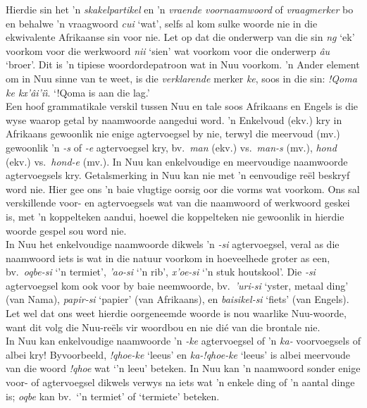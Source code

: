 Hierdie sin het 'n \emph{skakelpartikel} en 'n \emph{vraende
voornaamwoord} of \emph{vraagmerker} bo en behalwe 'n vraagwoord
\emph{cui} `wat', selfs al kom sulke woorde nie in die ekwivalente
Afrikaanse sin voor nie. Let op dat die onderwerp van die sin
\emph{ng} `ek' voorkom voor die werkwoord
\emph{n\textipa{\textvertline}ii} `sien' wat voorkom voor die
onderwerp \emph{\textipa{\textdoublevertline}\^{a}u} `broer'. Dit is
'n tipiese woordordepatroon wat in N\textipa{\textvertline}uu voorkom.
'n Ander element om in N\textipa{\textvertline}uu sinne van te weet,
is die \emph{verklarende} merker \emph{ke}, soos in die sin:
\emph{!Qoma ke kx'\^{a}i'i\^{\i}}.  `!Qoma is aan die lag.'\\

Een hoof grammatikale verskil tussen N\textipa{\textvertline}uu en
tale soos Afrikaans en Engels is die wyse waarop getal by naamwoorde
aangedui word. 'n Enkelvoud (ekv.) kry in Afrikaans gewoonlik nie
enige agtervoegsel by nie, terwyl die meervoud (mv.) gewoonlik 'n
\emph{-s} of \emph{-e} agtervoegsel kry, bv.\ \emph{man} (ekv.) vs.\
\emph{man-s} (mv.), \emph{hond} (ekv.) vs.\ \emph{hond-e} (mv.). In
N\textipa{\textvertline}uu kan enkelvoudige en meervoudige naamwoorde
agtervoegsels kry. Getalsmerking in N\textipa{\textvertline}uu kan nie
met 'n eenvoudige re\"{e}l beskryf word nie. Hier gee ons 'n baie
vlugtige oorsig oor die vorms wat voorkom. Ons sal verskillende voor-
en agtervoegsels wat van die naamwoord of werkwoord geskei is, met 'n
koppelteken aandui, hoewel die koppelteken nie gewoonlik in hierdie
woorde gespel sou word nie.\\

In N\textipa{\textvertline}uu het enkelvoudige naamwoorde dikwels 'n
\emph{-si} agtervoegsel, veral as die naamwoord iets is wat in die
natuur voorkom in hoeveelhede groter as een, bv.\
\emph{\textipa{\textdoublevertline}oqbe-si} `'n termiet',
\emph{\textipa{\textdoublebarpipe}'ao-si} `'n rib',
\emph{\textipa{\textdoublevertline}x'oe-si} `'n stuk houtskool'. Die
\emph{-si} agtervoegsel kom ook voor by baie neemwoorde, bv.\
\emph{\textipa{\textvertline}'uri-si} `yster, metaal ding' (van Nama),
\emph{papir-si} `papier' (van Afrikaans), en \emph{baisikel-si}
`fiets' (van Engels). Let wel dat ons weet hierdie oorgeneemde woorde
is nou waarlike N\textipa{\textvertline}uu-woorde, want dit volg die
N\textipa{\textvertline}uu-re\"{e}ls vir woordbou en nie di\'{e} van
die brontale nie.\\

In N\textipa{\textvertline}uu kan enkelvoudige naamwoorde 'n
\emph{-ke} agtervoegsel of 'n \emph{ka-} voorvoegsels of albei kry!
Byvoorbeeld, \emph{!qhoe-ke} `leeus' en \emph{ka-!qhoe-ke} `leeus' is
albei meervoude van die woord \emph{!qhoe} wat `'n leeu' beteken. In
N\textipa{\textvertline}uu kan 'n naamwoord sonder enige voor- of
agtervoegsel dikwels verwys na iets wat 'n enkele ding of 'n aantal
dinge is; \emph{\textipa{\textdoublevertline}oqbe} kan bv.\ `'n
termiet' of `termiete' beteken.\\

